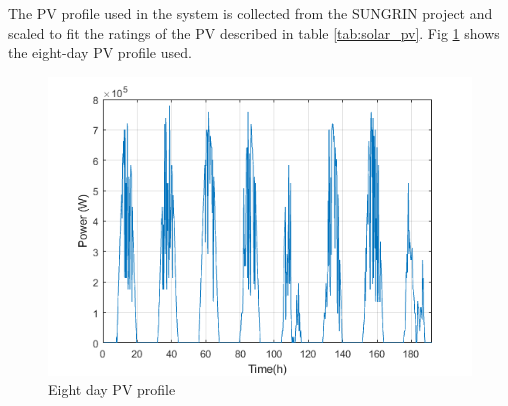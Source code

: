 The PV profile used in the system is collected from the SUNGRIN project and scaled to fit the ratings of the PV described in table \ref{tab:solar_pv}. Fig \ref{fig:PV_PROFILE_8} shows the eight-day PV profile used.

\begin{figure}[!ht]
    \centering
    \includegraphics[width = \linewidth]{figs/PV_PROFILE.png}
    \caption{Eight day PV profile}
    \label{fig:PV_PROFILE_8}
\end{figure}